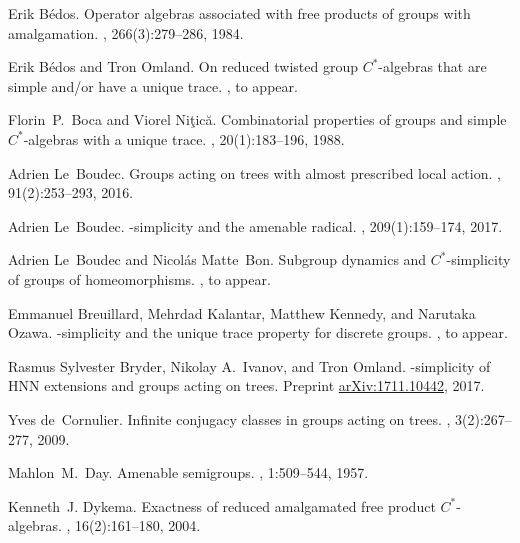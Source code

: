 \documentclass[a4paper]{amsart}
\theoremstyle{plain}
\theoremstyle{definition}
\theoremstyle{remark}
\numberwithin{theorem}{section}
\begin{document}


\begin{thebibliography}{99}

Erik B{\'e}dos.
\newblock Operator algebras associated with free products of groups with amalgamation.
, 266(3):279--286, 1984.

Erik B{\'e}dos and Tron Omland.
\newblock On reduced twisted group {$C^*$}-algebras that are simple and/or have a unique trace.
, to appear.

Florin~P.\ Boca and Viorel Ni{\c{t}}ic{\u{a}}.
\newblock Combinatorial properties of groups and simple {$C^*$}-algebras with a unique trace.
, 20(1):183--196, 1988.

Adrien Le~Boudec.
\newblock Groups acting on trees with almost prescribed local action.
, 91(2):253--293, 2016.

Adrien Le~Boudec.
-simplicity and the amenable radical.
, 209(1):159--174, 2017.


Adrien Le~Boudec and Nicol{\'a}s Matte~Bon.
\newblock Subgroup dynamics and {$C^*$}-simplicity of groups of homeomorphisms.
, to appear.

Emmanuel Breuillard, Mehrdad Kalantar, Matthew Kennedy, and Narutaka Ozawa.
-simplicity and the unique trace property for discrete groups.
, to appear.

Rasmus Sylvester Bryder, Nikolay A.\ Ivanov, and Tron Omland.
-simplicity of HNN extensions and groups acting on trees.
\newblock Preprint \href{http://arxiv.org/abs/1711.10442}{arXiv:1711.10442}, 2017.

Yves de~Cornulier.
\newblock Infinite conjugacy classes in groups acting on trees.
, 3(2):267--277, 2009.

Mahlon~M.\ Day.
\newblock Amenable semigroups.
, 1:509--544, 1957.

Kenneth~J. Dykema.
\newblock Exactness of reduced amalgamated free product {$C^*$}-algebras.
, 16(2):161--180, 2004.


\end{thebibliography}
\end{document}
